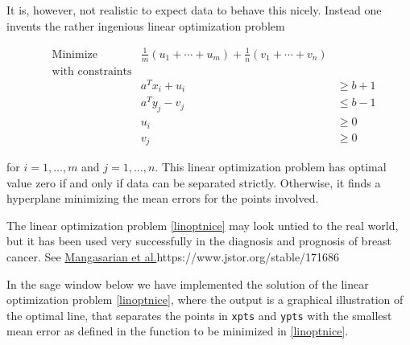 \documentclass{article}
\begin{document}
  It is, however, not realistic to expect data to behave this nicely. Instead one invents
  the rather ingenious linear optimization problem

  \begin{align}\label{linoptnice}
    &\text{Minimize} &\frac{1}{m}(u_1 + \cdots + u_m) + \frac{1}{n}(v_1 + \cdots + v_n)\\
    &\text{with constraints}\\
    &&a^T x_i + u_i&\geq b + 1\\
    &&a^T y_j - v_j &\leq b - 1\\
    &&u_i&\geq 0\\
    &&v_j&\geq 0
  \end{align}
  
  for $i = 1, \dots, m$ and $j = 1, \dots, n$. This linear optimization problem has optimal value zero
  if and only if data can be separated strictly. Otherwise, it finds a hyperplane minimizing the mean errors
  for the points involved.

  The linear optimization problem \eqref{linoptnice} may look untied to the real world, but it has
  been used very successfully in the diagnosis and prognosis of breast
  cancer. See \url{Mangasarian et al.}{https://www.jstor.org/stable/171686}

  In the sage window below we have implemented the solution of the
  linear optimization problem \eqref{linoptnice}, where the output is
  a graphical illustration of the optimal line, that separates the
  points in \texttt{xpts} and \texttt{ypts} with the smallest mean
  error as defined in the function to be minimized in \eqref{linoptnice}.
  
\end{document}
